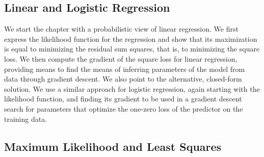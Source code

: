 \begin{refsection}
\chapter{Linear and Logistic Regression}

\begin{summary}
We start the chapter with a probabilistic view of linear regression. We first express the  likelihood function for the regression and show that its maximization is equal to minimizing the residual sum squares, that is, to minimizing the square loss. We then compute the gradient of the square loss for linear regression, providing means to find the means of inferring parameters of the model from data through gradient descent. We also point to the alternative, closed-form solution. We use a similar approach for logistic regression, again starting with the likelihood function, and finding its gradient to be used in a gradient descent search for parameters that optimize the one-zero loss of the predictor on the training data.
\end{summary}

\section{Maximum Likelihood and Least Squares}


\end{refsection}
